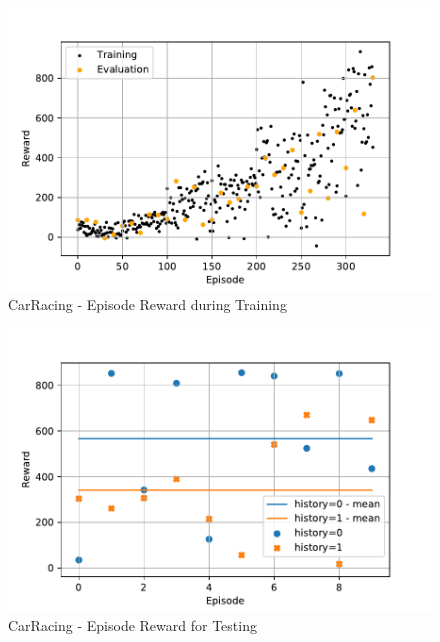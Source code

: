 \documentclass[
        a4paper,
        10pt,
        parskip = full,    %
    ]{scrartcl}
\begin{document}
\begin{figure}
  \begin{center}
    \includegraphics{./images/CarRacing-v0/tb_train_eval_reward.pdf}
    \caption{CarRacing - Episode Reward during Training}
    \label{CarRacingTrainEvalReward}
  \end{center}
\end{figure}


\begin{figure}
  \begin{center}
    \includegraphics{./images/CarRacing-v0/tb_test_reward.pdf}
    \caption{CarRacing - Episode Reward for Testing}
    \label{CarRacingTestReward}
  \end{center}
\end{figure}
\end{document}
